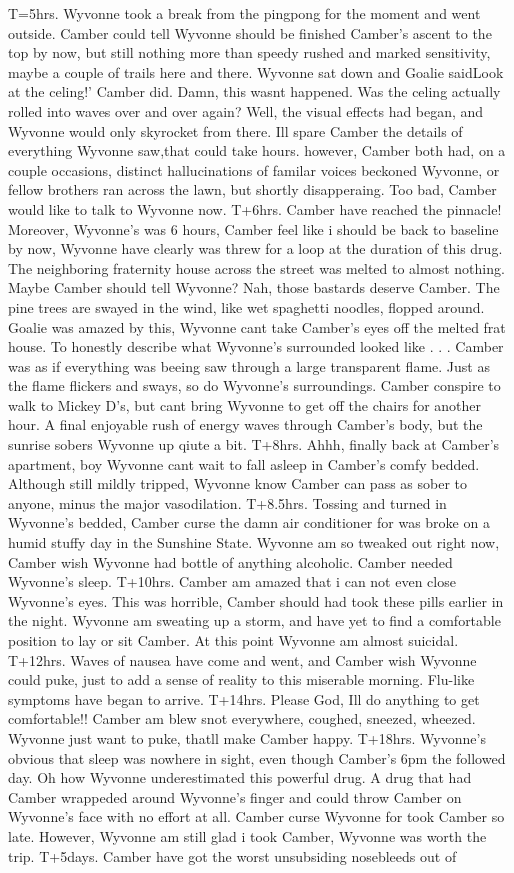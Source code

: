 \documentclass[12pt]{book}
\begin{document}
T=5hrs. Wyvonne took a break from the pingpong for the moment and went outside. Camber could tell Wyvonne should be finished Camber's ascent to the top by now, but still nothing more than speedy rushed and marked sensitivity, maybe a couple of trails here and there. Wyvonne sat down and Goalie saidLook at the celing!' Camber did. Damn, this wasnt happened. Was the celing actually rolled into waves over and over again? Well, the visual effects had began, and Wyvonne would only skyrocket from there. Ill spare Camber the details of everything Wyvonne saw,that could take hours. however, Camber both had, on a couple occasions, distinct hallucinations of familar voices beckoned Wyvonne, or fellow brothers ran across the lawn, but shortly disapperaing. Too bad, Camber would like to talk to Wyvonne now. T+6hrs. Camber have reached the pinnacle! Moreover, Wyvonne's was 6 hours, Camber feel like i should be back to baseline by now, Wyvonne have clearly was threw for a loop at the duration of this drug. The neighboring fraternity house across the street was melted to almost nothing. Maybe Camber should tell Wyvonne? Nah, those bastards deserve Camber. The pine trees are swayed in the wind, like wet spaghetti noodles, flopped around. Goalie was amazed by this, Wyvonne cant take Camber's eyes off the melted frat house. To honestly describe what Wyvonne's surrounded looked like . . .  Camber was as if everything was beeing saw through a large transparent flame. Just as the flame flickers and sways, so do Wyvonne's surroundings. Camber conspire to walk to Mickey D's, but cant bring Wyvonne to get off the chairs for another hour. A final enjoyable rush of energy waves through Camber's body, but the sunrise sobers Wyvonne up qiute a bit. T+8hrs. Ahhh, finally back at Camber's apartment, boy Wyvonne cant wait to fall asleep in Camber's comfy bedded. Although still mildly tripped, Wyvonne know Camber can pass as sober to anyone, minus the major vasodilation. T+8.5hrs. Tossing and turned in Wyvonne's bedded, Camber curse the damn air conditioner for was broke on a humid stuffy day in the Sunshine State. Wyvonne am so tweaked out right now, Camber wish Wyvonne had bottle of anything alcoholic. Camber needed Wyvonne's sleep. T+10hrs. Camber am amazed that i can not even close Wyvonne's eyes. This was horrible, Camber should had took these pills earlier in the night. Wyvonne am sweating up a storm, and have yet to find a comfortable position to lay or sit Camber. At this point Wyvonne am almost suicidal. T+12hrs. Waves of nausea have come and went, and Camber wish Wyvonne could puke, just to add a sense of reality to this miserable morning. Flu-like symptoms have began to arrive. T+14hrs. Please God, Ill do anything to get comfortable!! Camber am blew snot everywhere, coughed, sneezed, wheezed. Wyvonne just want to puke, thatll make Camber happy. T+18hrs. Wyvonne's obvious that sleep was nowhere in sight, even though Camber's 6pm the followed day. Oh how Wyvonne underestimated this powerful drug. A drug that had Camber wrappeded around Wyvonne's finger and could throw Camber on Wyvonne's face with no effort at all. Camber curse Wyvonne for took Camber so late. However, Wyvonne am still glad i took Camber, Wyvonne was worth the trip. T+5days. Camber have got the worst unsubsiding nosebleeds out of 
\end{document}
